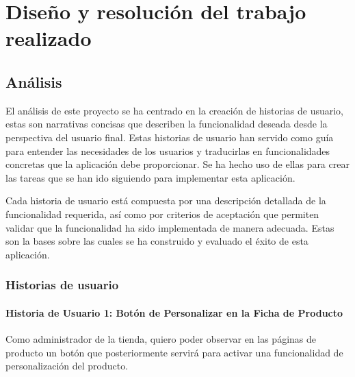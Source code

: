 \documentclass[12pt]{article}
\newcommand{\subsubsubsection}[1]{\paragraph{#1}}
\begin{document}
\newpage
\section{Diseño y resolución del trabajo realizado}

\subsection{Análisis}
El análisis de este proyecto se ha centrado en la creación de historias de usuario, estas son narrativas 
concisas que describen la funcionalidad deseada desde la perspectiva del usuario final. 
Estas historias de usuario han servido como guía para entender las necesidades de los usuarios y traducirlas en 
funcionalidades concretas que  la aplicación debe proporcionar. Se ha hecho uso de ellas para crear
las tareas que se han ido siguiendo para implementar esta aplicación.

Cada historia de usuario está compuesta por una descripción detallada de la funcionalidad requerida, así como por criterios de aceptación que 
permiten validar que la funcionalidad ha sido implementada de manera adecuada. Estas son la bases sobre las cuales se ha construido y evaluado el éxito de esta aplicación.

\subsubsection{Historias de usuario}

\subsubsubsection{Historia de Usuario 1: Botón de Personalizar en la Ficha de Producto}\label{sec:historia1}

Como administrador de la tienda, quiero poder observar en las páginas de producto un botón que posteriormente servirá para activar una funcionalidad de personalización del producto.
\end{document}
